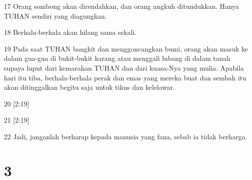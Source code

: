 \par 17 Orang sombong akan direndahkan, dan orang angkuh ditundukkan. Hanya TUHAN sendiri yang diagungkan.
\par 18 Berhala-berhala akan hilang sama sekali.
\par 19 Pada saat TUHAN bangkit dan menggoncangkan bumi, orang akan masuk ke dalam gua-gua di bukit-bukit karang atau menggali lubang di dalam tanah supaya luput dari kemarahan TUHAN dan dari kuasa-Nya yang mulia. Apabila hari itu tiba, berhala-berhala perak dan emas yang mereka buat dan sembah itu akan ditinggalkan begitu saja untuk tikus dan kelelawar.
\par 20 [2:19]
\par 21 [2:19]
\par 22 Jadi, janganlah berharap kepada manusia yang fana, sebab ia tidak berharga.

\chapter{3}

